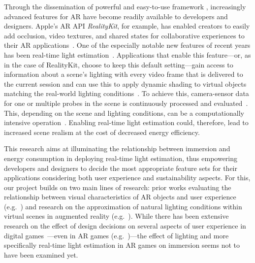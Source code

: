 \documentclass[12pt,twoside,english]{article}
\begin{document}
Through the dissemination of powerful and easy-to-use framework , increasingly advanced features for \gls{AR} have become readily available to developers and designers.
Apple's \gls{AR} \gls{API} \textit{RealityKit}, for example, has enabled creators to easily add occlusion, video textures, and shared states for collaborative experiences to their \gls{AR} applications~\cite{apple_realitykit_2020-1}.
One of the especially notable new features of recent years has been real-time light estimation~\cite{apple_arlightestimate_2020}.
Applications that enable this feature---or, as in the case of RealityKit, choose to keep this default setting---gain access to information about a scene's lighting with every video frame that is delivered to the current session and can use this to apply dynamic shading to virtual objects matching the real-world lighting conditions~\cite{apple_arlightestimate_2020}.
To achieve this, camera-sensor data for one or multiple probes in the scene is continuously processed and evaluated~\cite{apple_arlightestimate_2020,apple_disablearenvironmentlighting_2020}.
This, depending on the scene and lighting conditions, can be a computationally intensive operation~\cite{steed_constructing_2016}.
Enabling real-time light estimation could, therefore, lead to increased scene realism at the cost of decreased energy efficiency.

This research aims at illuminating the relationship between immersion and energy consumption in deploying real-time light estimation, thus empowering developers and designers to decide the most appropriate feature sets for their applications considering both user experience and sustainability aspects.
For this, our project builds on two main lines of research: prior works evaluating the relationship between visual characteristics of \gls{AR} objects and user experience (e.g.~\cite{gabbard_effects_2006}) and research on the approximation of natural lighting conditions within virtual scenes in augmented reality (e.g.~\cite{aittala_inverse_2010}).
While there has been extensive research on the effect of design decisions on several aspects of user experience in digital games~\cite{johnson_validation_2018}---even in \gls{AR} games (e.g.~\cite{georgiou_development_2017})---the effect of lighting and more specifically real-time light estimation in \gls{AR} games on immersion seems not to have been examined yet.
\end{document}
